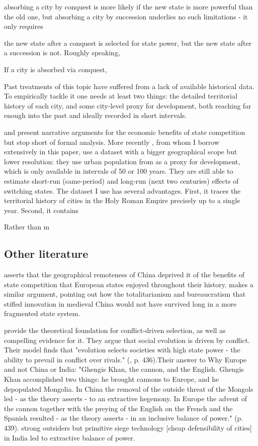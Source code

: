 \documentclass{article}
\begin{document}
absorbing a city by conquest is more likely if the new state is more powerful than the old one, but absorbing a city by succession underlies no such limitations - it only requires 

the new state after a conquest is selected for state power, but the new state after a succession is not. Roughly speaking, 


If a city is absorbed via conquest, 


Past treatments of this topic have suffered from a lack of available historical data. To empirically tackle it one needs at least two things: the detailed territorial history of each city, and some city-level proxy for development, both reaching far enough into the past and ideally recorded in short intervals.


\cite{diamond1997} and \cite{landes2006} present narrative arguments for the economic benefits of state competition but stop short of formal analysis. 
More recently \cite{schoenholzer2022}, from whom I borrow extensively in this paper, use a dataset with a bigger geographical scope but lower resolution: they use urban population from \cite{bairoch1988} as a proxy for development, which is only available in intervals of 50 or 100 years. They are still able to estimate short-run (same-period) and long-run (next two centuries) effects of switching states. 
The dataset I use has several advantages. First, it traces the territorial history of cities in the Holy Roman Empire precisely up to a single year. Second, it contains 

Rather than m

\subsection*{Other literature}

\cite{diamond1997} asserts that the geographical remoteness of China deprived it of the benefits of state competition that European states enjoyed throughout their history. \cite{landes2006} makes a similar argument, pointing out how the totalitarianism and bureaucratism that stifled innovation in medieval China would not have survived long in a more fragmented state system.

\cite{levine2013, levine2021} provide the theoretical foundation for conflict-driven selection, as well as compelling evidence for it. 
They argue that social evolution is driven by conflict. Their model finds that "evolution selects societies with high state power - the ability to prevail in conflict over rivals." (\citealp{levine2021}, p. 436).Their answer to Why Europe and not China or India: "Ghengis Khan, the cannon, and the English. Ghengis Khan accomplished two things: he brought cannons to Europe, and he depopulated Mongolia. In China the removal of the outside threat of the Mongols led - as the theory asserts - to an extractive hegemony. In Europe the advent of the cannon together with the preying of the English on the French and the Spanish resulted - as the theory asserts - in an inclusive balance of power." (p. 439). strong outsiders but primitive siege technology [cheap defensibility of cities] in India led to extractive balance of power.  
\end{document}
